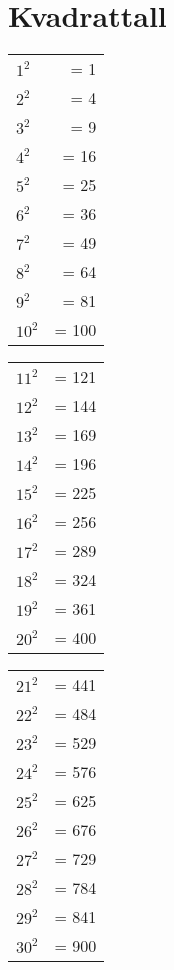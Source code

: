 \documentclass[11pt]{article}
\begin{document}
\section*{Kvadrattall}
\begin{multicols}{3}
\small
\begin{tabular}{@{}lr@{}}
$1^2$  &= 1   \\
$2^2$  &= 4   \\
$3^2$  &= 9   \\
$4^2$  &= 16  \\
$5^2$  &= 25  \\
$6^2$  &= 36  \\
$7^2$  &= 49  \\
$8^2$  &= 64  \\
$9^2$  &= 81  \\
$10^2$ &= 100 \\
\end{tabular}

\columnbreak
\begin{tabular}{@{}lr@{}}
$11^2$ &= 121 \\
$12^2$ &= 144 \\
$13^2$ &= 169 \\
$14^2$ &= 196 \\
$15^2$ &= 225 \\
$16^2$ &= 256 \\
$17^2$ &= 289 \\
$18^2$ &= 324 \\
$19^2$ &= 361 \\
$20^2$ &= 400 \\
\end{tabular}

\columnbreak
\begin{tabular}{@{}lr@{}}
$21^2$ &= 441 \\
$22^2$ &= 484 \\
$23^2$ &= 529 \\
$24^2$ &= 576 \\
$25^2$ &= 625 \\
$26^2$ &= 676 \\
$27^2$ &= 729 \\
$28^2$ &= 784 \\
$29^2$ &= 841 \\
$30^2$ &= 900 \\
\end{tabular}
\end{multicols}

\end{document}
